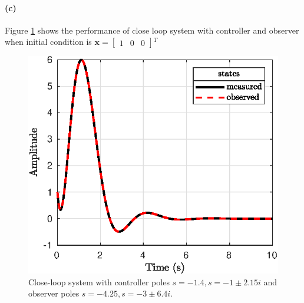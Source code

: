 \paragraph{(c)} Figure \ref{fig:plot_equation_3d} shows the performance of close loop system with controller and observer when initial condition is $\mathbf{x}=\begin{bmatrix}
1 & 0 & 0
\end{bmatrix}$$^T$ 

\begin{figure}
\centering
\includegraphics{images/plot_question_3d.eps}
\caption{Close-loop system with controller poles $s=-1.4,s=-1\pm2.15i$ and observer poles $s=-4.25,s=-3\pm6.4i$.}
\label{fig:plot_equation_3d}
\end{figure}